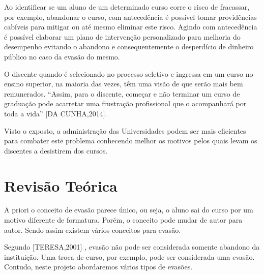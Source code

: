 Ao identificar se um aluno de um determinado curso corre o risco de fracassar, por exemplo, abandonar o curso, com antecedência é possível tomar providências cabíveis para mitigar ou até mesmo eliminar este risco. Agindo com antecedência é possível elaborar um plano de intervenção personalizado para melhoria do desempenho evitando o abandono e consequentemente o desperdício de dinheiro público no caso da evasão do mesmo.

O discente quando é selecionado no processo seletivo e ingressa em um curso no ensino superior, na maioria das vezes, têm uma visão de que serão mais bem remunerados. “Assim, para o discente, começar e não terminar um curso de graduação pode acarretar uma frustração profissional que o acompanhará por toda a vida” [DA CUNHA,2014].

Visto o exposto, a administração das Universidades podem ser mais eficientes para combater este problema conhecendo melhor os motivos pelos quais levam os discentes a desistirem dos cursos.  
 \begin{comment} 
\section{Metodologia}%

Para realização do estudo serão usadas como fonte as bases de dados dos sistemas de controle acadêmicos da Universidade de Brasília, com enfoque no ciclo de vida acadêmico dos discentes e docentes. Aplicar técnicas de mineração de dados para a descoberta de novos padrões relacionados as diversas formas de evasões dos cursos ofertados pela UnB para que possam prever tendências que  auxiliarão a equipe de planejamento a acompanhar e definir as metas e diretrizes da Universidade no âmbito acadêmico.
\end{comment}

\section{Revisão Teórica}%

A priori o conceito de evasão parece único, ou seja, o aluno sai do curso por um motivo diferente de formatura.  Porém, o conceito pode mudar de autor para autor. Sendo assim existem vários conceitos para evasão. 

Segundo [TERESA,2001] %
, evasão não pode ser considerada somente abandono da instituição. Uma troca de curso, por exemplo, pode ser considerada uma evasão. Contudo, neste projeto abordaremos vários tipos de evasões.
 
